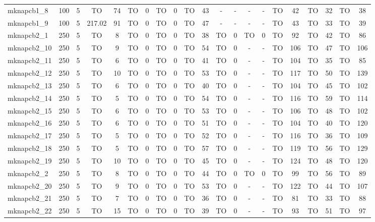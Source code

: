 \begin{sidewaystable}[!ht]
{\begin{tabular}{lcccccccccccccccccccc}
mknapcb1\_8 & 100 & 5 & TO & 74 & TO & 0 & TO & 0 & TO & 43 &  - &  - &  - &  - & TO & 42 & TO & 32 & TO & 38 \\
mknapcb1\_9 & 100 & 5 & 217.02 & 91 & TO & 0 & TO & 0 & TO & 47 &  - &  - &  - &  - & TO & 43 & TO & 33 & TO & 39 \\
mknapcb2\_1 & 250 & 5 & TO & 8 & TO & 0 & TO & 0 & TO & 38 & TO & 0 & TO & 0 & TO & 92 & TO & 42 & TO & 86 \\
mknapcb2\_10 & 250 & 5 & TO & 9 & TO & 0 & TO & 0 & TO & 54 & TO & 0 &  - &  - & TO & 106 & TO & 47 & TO & 106 \\
mknapcb2\_11 & 250 & 5 & TO & 6 & TO & 0 & TO & 0 & TO & 41 & TO & 0 &  - &  - & TO & 104 & TO & 35 & TO & 85 \\
mknapcb2\_12 & 250 & 5 & TO & 10 & TO & 0 & TO & 0 & TO & 53 & TO & 0 &  - &  - & TO & 117 & TO & 50 & TO & 139 \\
mknapcb2\_13 & 250 & 5 & TO & 6 & TO & 0 & TO & 0 & TO & 40 & TO & 0 &  - &  - & TO & 104 & TO & 45 & TO & 102 \\
mknapcb2\_14 & 250 & 5 & TO & 5 & TO & 0 & TO & 0 & TO & 54 & TO & 0 &  - &  - & TO & 116 & TO & 59 & TO & 114 \\
mknapcb2\_15 & 250 & 5 & TO & 6 & TO & 0 & TO & 0 & TO & 53 & TO & 0 &  - &  - & TO & 106 & TO & 48 & TO & 102 \\
mknapcb2\_16 & 250 & 5 & TO & 6 & TO & 0 & TO & 0 & TO & 51 & TO & 0 &  - &  - & TO & 104 & TO & 40 & TO & 120 \\
mknapcb2\_17 & 250 & 5 & TO & 5 & TO & 0 & TO & 0 & TO & 52 & TO & 0 &  - &  - & TO & 116 & TO & 36 & TO & 109 \\
mknapcb2\_18 & 250 & 5 & TO & 5 & TO & 0 & TO & 0 & TO & 57 & TO & 0 &  - &  - & TO & 119 & TO & 56 & TO & 129 \\
mknapcb2\_19 & 250 & 5 & TO & 10 & TO & 0 & TO & 0 & TO & 45 & TO & 0 &  - &  - & TO & 124 & TO & 48 & TO & 120 \\
mknapcb2\_2 & 250 & 5 & TO & 8 & TO & 0 & TO & 0 & TO & 44 & TO & 0 & TO & 0 & TO & 99 & TO & 56 & TO & 89 \\
mknapcb2\_20 & 250 & 5 & TO & 9 & TO & 0 & TO & 0 & TO & 53 & TO & 0 &  - &  - & TO & 122 & TO & 44 & TO & 107 \\
mknapcb2\_21 & 250 & 5 & TO & 7 & TO & 0 & TO & 0 & TO & 36 & TO & 0 &  - &  - & TO & 81 & TO & 33 & TO & 88 \\
mknapcb2\_22 & 250 & 5 & TO & 15 & TO & 0 & TO & 0 & TO & 39 & TO & 0 &  - &  - & TO & 93 & TO & 51 & TO & 97 \\

\end{tabular}}
\end{sidewaystable}
